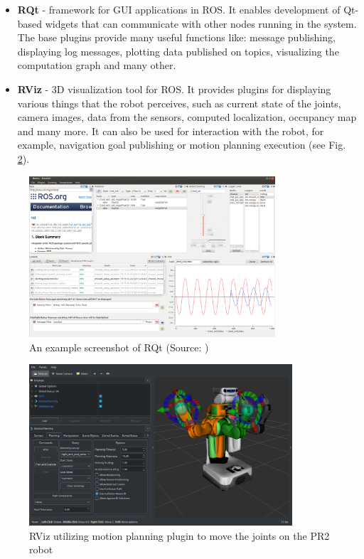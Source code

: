\documentclass[english,inz,shortabstract]{iithesis}
\begin{document}
        \begin{itemize}[itemsep=0pt, parsep=2pt, topsep=0pt]
            \item \textbf{RQt} - framework for GUI applications in ROS. It enables development of Qt-based widgets that can communicate with other nodes running in the system. The base plugins provide many useful functions like: message publishing, displaying log messages, plotting data published on topics, visualizing the computation graph and many other.
            \item \textbf{RViz} - 3D visualization tool for ROS. It provides plugins for displaying various things that the robot perceives, such as current state of the joints, camera images, data from the sensors, computed localization, occupancy map and many more. It can also be used for interaction with the robot, for example, navigation goal publishing or motion planning execution (see Fig. \ref{fig:rviz_pr2}).
        \end{itemize}

        \begin{figure}[ht]
            \centering
            \captionsetup{margin=2cm}
            \includegraphics[height=6cm]{img/rqt.png}
            \caption{An example screenshot of RQt (Source: \cite{ros:rqt})}
            \label{fig:rqt}
        \end{figure}

\pagebreak

        \begin{figure}[ht]
            \centering
            \captionsetup{margin=2cm}
            \includegraphics[height=6cm]{img/rviz_pr2.png}
            \caption{RViz utilizing motion planning plugin to move the joints on the PR2 robot}
            \label{fig:rviz_pr2}
        \end{figure}
\end{document}
